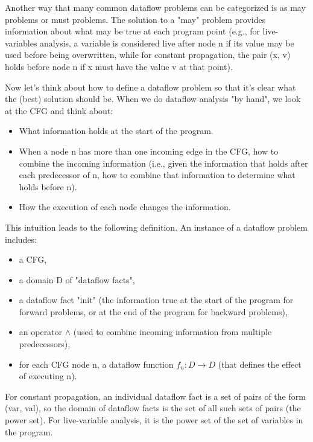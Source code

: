 Another way that many common dataflow problems can be categorized is as 
may problems or must problems. The solution to a "may" problem provides 
information about what may be true at each program point 
(e.g., for live-variables analysis, a variable is considered live after 
node n if its value may be used before being overwritten, 
while for constant propagation, the pair (x, v) holds before node n if x
 must have the value v at that point).

Now let's think about how to define a dataflow problem so that it's 
clear what the (best) solution should be. When we do dataflow analysis 
"by hand", we look at the CFG and think about:

\begin{itemize}
	\item 	What information holds at the start of the program.
	\item 	When a node n has more than one incoming edge in the CFG, how to combine the incoming information (i.e., given the information that holds after each predecessor of n, how to combine that information to determine what holds before n).
	\item 	How the execution of each node changes the information.
	
\end{itemize}	
This intuition leads to the following definition. An instance of a dataflow problem includes:


\begin{itemize}
	\item a CFG,
	\item a domain D of "dataflow facts",
	\item a dataflow fact "init" (the information true at the start of the program for forward problems, or at the end of the program for backward problems),
	\item an operator $\wedge$ (used to combine incoming information from multiple predecessors),
	\item for each CFG node n, a dataflow function $f_n : D \rightarrow D$ (that defines the effect of executing n).
			
\end{itemize}	

For constant propagation, an individual dataflow fact is a set of pairs of the form (var, val), so the domain of dataflow facts is the set of all such sets of pairs (the power set). For live-variable analysis, it is the power set of the set of variables in the program.

